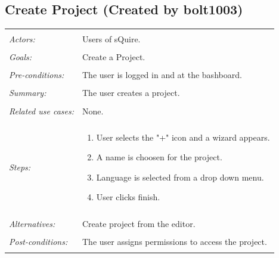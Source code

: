\documentclass[11pt]{report}
\begin{document}
\subsection{Create Project (Created by bolt1003)}
\begin{tabular}{ p{2cm} p{12cm} }
 \hline
 \\
 \textit{Actors:} & Users of sQuire. \\ 
 \\
 \textit{Goals:} & Create a Project. \\
 \\
 \textit{Pre-conditions:} & The user is logged in and at the bashboard. \\
 \\
 \textit{Summary:} & The user creates a project. \\ 
 \\
 \textit{Related use cases:} & None. \\ 
 \\
 \textit{Steps:} & \begin{enumerate}
  \item User selects the "+" icon and a wizard appears.
  \item A name is choosen for the project.
  \item Language is selected from a drop down menu.
  \item User clicks finish.
 \end{enumerate} \\
 \\
 \textit{Alternatives:} & Create project from the editor. \\
 \\
 \textit{Post-conditions:} & The user assigns permissions to access the project. \\
 \\
\hline
\end{tabular}
\end{document}
